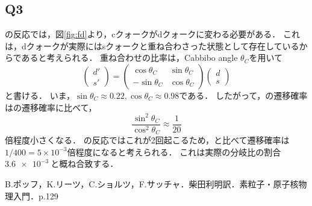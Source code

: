 \documentclass[a4paper,11pt]{jsarticle}
\begin{document}
\subsection*{Q3}
の反応では，図\ref{fig:fd}より，cクォークがdクォークに変わる必要がある．
これは，dクォークが実際にはsクォークと重ね合わさった状態として存在しているからであると考えられる．
重ね合わせの比率は，Cabbibo angle $\theta_C$を用いて
\begin{equation}
  \left(
  \begin{matrix}
    d'\\
    s'
  \end{matrix}
  \right)
  =
  \left(
  \begin{matrix}
    \cos{\theta_C} & \sin{\theta_C} \\
    -\sin{\theta_C} & \cos{\theta_C}
  \end{matrix}
  \right)
  \left(
  \begin{matrix}
    d \\
    s
  \end{matrix}
  \right)
\end{equation}
と書ける．
いま，$\sin{\theta_C}\approx 0.22, \cos{\theta_C}\approx 0.98$である．
したがって，の遷移確率はの遷移確率に比べて，
\begin{equation}
  \frac{\sin^2{\theta_C}}{\cos^2{\theta_C}} \approx \frac{1}{20}
\end{equation}
倍程度小さくなる．
の反応ではこれが2回起こるため，と比べて遷移確率は$1/400= 5\times 10^{-3}$倍程度になると考えられる．
これは実際の分岐比の割合$\SI{3.6e-3}{}$と概ね合致する．

\begin{thebibliography}{99}
   B.ポッフ，K.リーツ，C.ショルツ，F.サッチャ．柴田利明訳．素粒子・原子核物理入門．p.129
\end{thebibliography}
\end{document}
